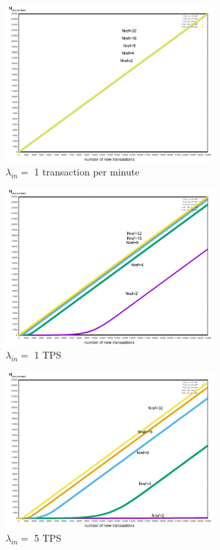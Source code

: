 \documentclass[a4paper,10pt,twocolumn]{article}
\begin{document}
	 \begin{appendices}
	\label{Appendix B}
	
	 \begin{figure}[H]
		\begin{center}
			\includegraphics[width=80mm]{1min_ref.png}
			\caption{$ \lambda_{in}=$ 1 transaction per minute}
		  \label{fig:min1_ref}
		\end{center}
	 \end{figure}
	
	 \begin{figure}[H]
		\begin{center}
			\includegraphics[width=80mm]{1sec_ref.png}
			\caption{$\lambda_{in}=$ 1 TPS}
		  \label{fig:sec1_ref}
		\end{center}
	 \end{figure}
	
	
	 \begin{figure}[H]
		\begin{center}
			\includegraphics[width=80mm]{5sec_ref.png}
			\caption{ $ \lambda_{in}=$ 5  TPS}
		  \label{fig:sec5_ref}
		\end{center}
	 \end{figure}
	

\end{appendices}
\end{document}
